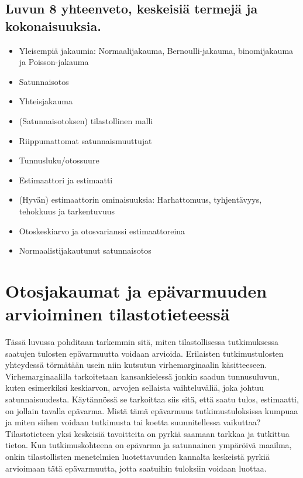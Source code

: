\documentclass[
]{book}
\providecommand{\tightlist}{%
  \setlength{\itemsep}{0pt}\setlength{\parskip}{0pt}}
\begin{document}
\hypertarget{luvun-8-yhteenveto-keskeisiuxe4-termejuxe4-ja-kokonaisuuksia.}{%
\section{Luvun 8 yhteenveto, keskeisiä termejä ja kokonaisuuksia.}\label{luvun-8-yhteenveto-keskeisiuxe4-termejuxe4-ja-kokonaisuuksia.}}

\begin{itemize}
\tightlist
\item
  Yleisempiä jakaumia: Normaalijakauma, Bernoulli-jakauma, binomijakauma ja Poisson-jakauma
\item
  Satunnaisotos
\item
  Yhteisjakauma
\item
  (Satunnaisotoksen) tilastollinen malli
\item
  Riippumattomat satunnaismuuttujat
\item
  Tunnusluku/otossuure
\item
  Estimaattori ja estimaatti
\item
  (Hyvän) estimaattorin ominaisuuksia: Harhattomuus, tyhjentävyys, tehokkuus ja tarkentuvuus
\item
  Otoskeskiarvo ja otosvarianssi estimaattoreina
\item
  Normaalistijakautunut satunnaisotos
\end{itemize}


\hypertarget{luku9}{%
\chapter{Otosjakaumat ja epävarmuuden arvioiminen tilastotieteessä}\label{luku9}}

Tässä luvussa pohditaan tarkemmin sitä, miten tilastollisessa tutkimuksessa saatujen tulosten epävarmuutta voidaan arvioida. Erilaisten tutkimustulosten yhteydessä törmätään usein niin kutsutun virhemarginaalin käsitteeseen. Virhemarginaalilla tarkoitetaan kansankielessä jonkin saadun tunnusuluvun, kuten esimerkiksi keskiarvon, arvojen sellaista vaihteluväliä, joka johtuu satunnaisuudesta. Käytännössä se tarkoittaa siis sitä, että saatu tulos, estimaatti, on jollain tavalla epävarma. Mistä tämä epävarmuus tutkimustuloksissa kumpuaa ja miten siihen voidaan tutkimusta tai koetta suunnitellessa vaikuttaa? Tilastotieteen yksi keskeisiä tavoitteita on pyrkiä saamaan tarkkaa ja tutkittua tietoa. Kun tutkimuskohteena on epävarma ja satunnainen ympäröivä maailma, onkin tilastollisten menetelmien luotettavuuden kannalta keskeistä pyrkiä arvioimaan tätä epävarmuutta, jotta saatuihin tuloksiin voidaan luottaa.
\end{document}
